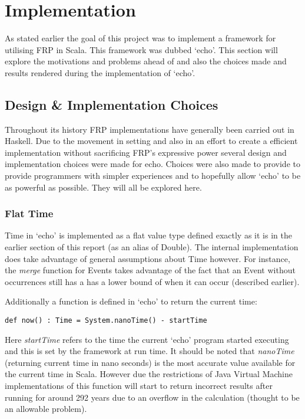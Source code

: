 \chapter{Implementation}
  As stated earlier the goal of this project was to implement a framework for utilising FRP in Scala. 
  This framework was dubbed `echo'. This section will explore the motivations and problems ahead of
  and also the choices made and results rendered during the implementation of `echo'.
  
  \section{Design \& Implementation Choices}
  Throughout its history FRP implementations have generally been carried out in Haskell. Due to the movement
  in setting and also in an effort to create a efficient implementation without sacrificing FRP's expressive power
  several design and implementation choices were made for echo. Choices were also made
  to provide to provide programmers with simpler experiences and to hopefully allow `echo' to be
  as powerful as possible. They will all be explored here.
  
    \subsection{Flat Time}
      Time in `echo' is implemented as a flat value type defined exactly as it is in the earlier
      section of this report (as an alias of Double). The internal implementation does take advantage
      of general assumptions about Time however. For instance, the \emph{merge} function for Events takes advantage
      of the fact that an Event without occurrences still has a has a lower bound of when it can occur (described
      earlier). 
      
      Additionally a function is defined in `echo' to return the current time:
      
\begin{verbatim}
def now() : Time = System.nanoTime() - startTime
\end{verbatim}      

      Here \emph{startTime} refers to the time the current `echo' program started executing and this is
      set by the framework at run time. It should be noted that \emph{nanoTime} (returning current time in
      nano seconds) is the most accurate value available for the current time in Scala. However due the restrictions
      of Java Virtual Machine implementations of this function will start to return incorrect results 
      after running for around 292 years due to an overflow in the calculation (thought to be an allowable
      problem).
      
